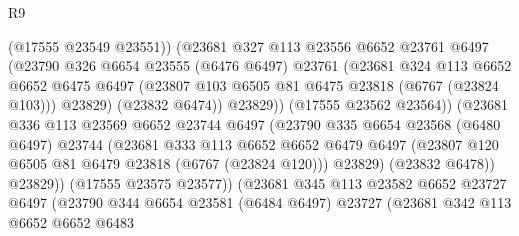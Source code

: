 \begin{lexlean}{R9}
\begin{coremodule}
                              (@17555 @23549 @23551))
                            (@23681
                              @327
                              @113
                              @23556
                              @6652
                              @23761
                              @6497
                              (@23790
                                @326
                                @6654
                                @23555
                                (@6476 @6497)
                                @23761
                                (@23681
                                  @324
                                  @113
                                  @6652
                                  @6652
                                  @6475
                                  @6497
                                  (@23807 @103 @6505 @81 @6475 @23818 (@6767 (@23824 @103)))
                                  @23829)
                                (@23832 @6474))
                              @23829))
                          (@17555 @23562 @23564))
                        (@23681
                          @336
                          @113
                          @23569
                          @6652
                          @23744
                          @6497
                          (@23790
                            @335
                            @6654
                            @23568
                            (@6480 @6497)
                            @23744
                            (@23681
                              @333
                              @113
                              @6652
                              @6652
                              @6479
                              @6497
                              (@23807 @120 @6505 @81 @6479 @23818 (@6767 (@23824 @120)))
                              @23829)
                            (@23832 @6478))
                          @23829))
                      (@17555 @23575 @23577))
                    (@23681
                      @345
                      @113
                      @23582
                      @6652
                      @23727
                      @6497
                      (@23790
                        @344
                        @6654
                        @23581
                        (@6484 @6497)
                        @23727
                        (@23681
                          @342
                          @113
                          @6652
                          @6652
                          @6483

\end{coremodule}
\end{lexlean}
